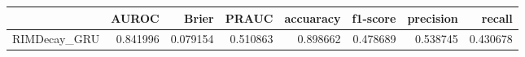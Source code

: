 \begin{tabular}{lrrrrrrr}
\toprule
{} &     AUROC &     Brier &     PRAUC &  accuaracy &  f1-score &  precision &    recall \\
\midrule
RIMDecay\_GRU &  0.841996 &  0.079154 &  0.510863 &   0.898662 &  0.478689 &   0.538745 &  0.430678 \\
\bottomrule
\end{tabular}
